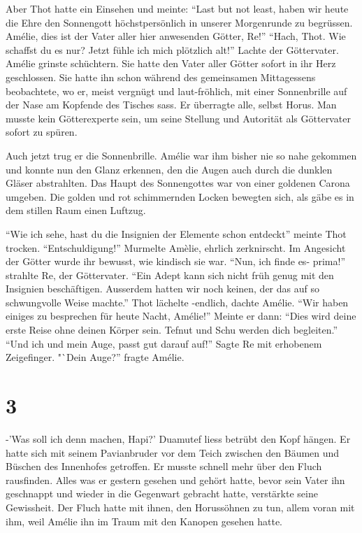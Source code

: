 \documentclass[11pt,titlepage,a5paper]{book}
\begin{document}
Aber Thot hatte ein Einsehen und meinte: "`Last but not least, haben wir heute die Ehre den Sonnengott höchstpersönlich in unserer Morgenrunde zu begrüssen. Amélie, dies ist der Vater aller hier anwesenden Götter, Re!"' "`Hach, Thot. Wie schaffst du es nur? Jetzt fühle ich mich plötzlich alt!"' Lachte der Göttervater. Amélie grinste schüchtern. Sie hatte den Vater aller Götter sofort in ihr Herz geschlossen. Sie hatte ihn schon während des gemeinsamen Mittagessens beobachtete, wo er, meist vergnügt und laut-fröhlich, mit einer Sonnenbrille auf der Nase am Kopfende des Tisches sass. Er überragte alle, selbst Horus. Man musste kein Götterexperte sein, um seine Stellung und Autorität als Göttervater sofort zu spüren.

Auch jetzt trug er die Sonnenbrille. Amélie war ihm bisher nie so nahe gekommen und konnte nun den Glanz erkennen, den die Augen auch durch die dunklen Gläser abstrahlten. Das Haupt des Sonnengottes war von einer goldenen Carona umgeben. Die golden und rot schimmernden Locken bewegten sich, als gäbe es in dem stillen Raum einen Luftzug. 

"`Wie ich sehe, hast du die Insignien der Elemente schon entdeckt"' meinte Thot trocken. "`Entschuldigung!"' Murmelte Amèlie, ehrlich zerknirscht. Im Angesicht der Götter wurde ihr bewusst, wie kindisch sie war. "`Nun, ich finde es- prima!"' strahlte Re, der Göttervater. "`Ein Adept kann sich nicht früh genug mit den Insignien beschäftigen. Ausserdem hatten wir noch keinen, der das auf so schwungvolle Weise machte."' Thot lächelte -endlich, dachte Amélie. "`Wir haben einiges zu besprechen für heute Nacht, Amélie!"' Meinte er dann: "`Dies wird deine erste Reise ohne deinen Körper sein. Tefnut und Schu werden dich begleiten."' "`Und ich und mein Auge, passt gut darauf auf!"' Sagte Re mit erhobenem Zeigefinger. "`Dein Auge?'' fragte Amélie.

\section*{3}

-'Was soll ich denn machen, Hapi?' Duamutef liess betrübt den Kopf hängen. Er hatte sich mit seinem Pavianbruder vor dem Teich zwischen den Bäumen und Büschen des Innenhofes getroffen. Er musste schnell mehr über den Fluch rausfinden. Alles was er gestern gesehen und gehört hatte, bevor sein Vater ihn geschnappt und wieder in die Gegenwart gebracht hatte, verstärkte seine Gewissheit. Der Fluch hatte mit ihnen, den Horussöhnen zu tun, allem voran mit ihm, weil Amélie ihn im Traum mit den Kanopen gesehen hatte.
\end{document}
